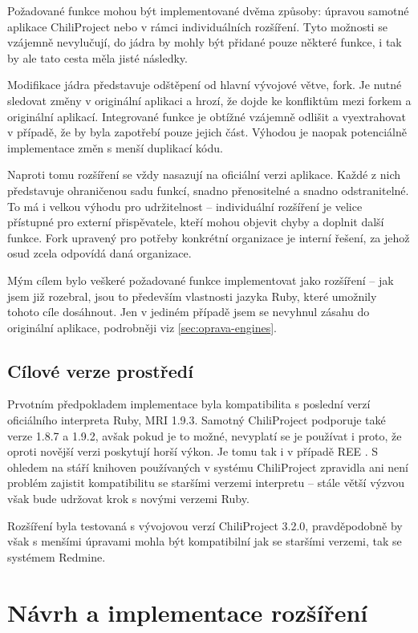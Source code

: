 \documentclass[thesis=B,czech]{FITthesis}[2012/05/02]
\begin{document}
Požadované funkce mohou být implementované dvěma způsoby: úpravou
samotné aplikace ChiliProject nebo v rámci individuálních rozšíření.
Tyto možnosti se vzájemně nevylučují, do jádra by mohly být přidané
pouze některé funkce, i tak by ale tato cesta měla jisté následky.

Modifikace jádra představuje odštěpení od hlavní vývojové větve,
\gls{fork}. Je nutné sledovat změny v originální aplikaci a hrozí, že
dojde ke konfliktům mezi forkem a originální aplikací. Integrované
funkce je obtížné vzájemně odlišit a vyextrahovat v případě, že by byla
zapotřebí pouze jejich část. Výhodou je naopak potenciálně 
implementace změn s menší duplikací kódu.

Naproti tomu rozšíření se vždy nasazují na oficiální verzi aplikace.
Každé z nich představuje ohraničenou sadu funkcí, snadno přenositelné a
snadno odstranitelné. To má i velkou výhodu pro udržitelnost --
individuální rozšíření je velice přístupné pro externí přispěvatele,
kteří mohou objevit chyby a doplnit další funkce. Fork upravený pro
potřeby konkrétní organizace je interní řešení, za jehož osud zcela
odpovídá daná organizace.

Mým cílem bylo veškeré požadované funkce implementovat jako rozšíření --
jak jsem již rozebral, jsou to především vlastnosti jazyka Ruby, které
umožnily tohoto cíle dosáhnout. Jen v jediném případě jsem se nevyhnul
zásahu do originální aplikace, podrobněji viz
\ref{sec:oprava-engines}.

\section{Cílové verze prostředí}

Prvotním předpokladem implementace byla kompatibilita s poslední verzí
oficiálního interpreta Ruby, \gls{MRI} 1.9.3. Samotný ChiliProject
podporuje také verze 1.8.7 a 1.9.2, avšak pokud je to možné, nevyplatí se
je používat i proto, že oproti novější verzi poskytují horší výkon. Je tomu
tak i v případě \gls{REE} \citep[End of Life]{REEEOL}. S ohledem na stáří
knihoven používaných v systému ChiliProject zpravidla ani není problém
zajistit kompatibilitu se staršími verzemi interpretu -- stále větší
výzvou však bude udržovat krok s novými verzemi Ruby.

Rozšíření byla testovaná s vývojovou verzí ChiliProject 3.2.0,
pravděpodobně by však s menšími úpravami mohla být kompatibilní jak se
staršími verzemi, tak se systémem Redmine.

\chapter{Návrh a implementace rozšíření}
\end{document}
